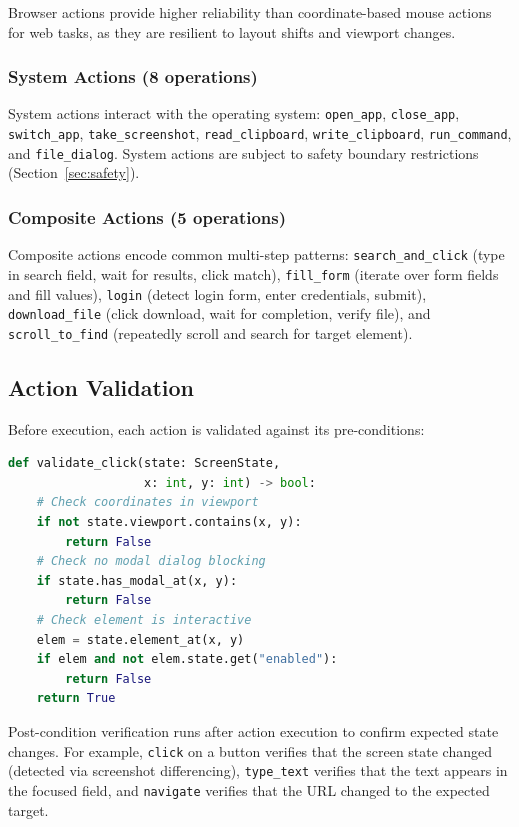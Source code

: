 \documentclass[11pt,twocolumn]{article}
\begin{document}
Browser actions provide higher reliability than coordinate-based mouse actions for web tasks, as they are resilient to layout shifts and viewport changes.

\subsubsection{System Actions (8 operations)}

System actions interact with the operating system: \texttt{open\_app}, \texttt{close\_app}, \texttt{switch\_app}, \texttt{take\_screenshot}, \texttt{read\_clipboard}, \texttt{write\_clipboard}, \texttt{run\_command}, and \texttt{file\_dialog}. System actions are subject to safety boundary restrictions (Section~\ref{sec:safety}).

\subsubsection{Composite Actions (5 operations)}

Composite actions encode common multi-step patterns: \texttt{search\_and\_click} (type in search field, wait for results, click match), \texttt{fill\_form} (iterate over form fields and fill values), \texttt{login} (detect login form, enter credentials, submit), \texttt{download\_file} (click download, wait for completion, verify file), and \texttt{scroll\_to\_find} (repeatedly scroll and search for target element).

\subsection{Action Validation}

Before execution, each action is validated against its pre-conditions:

\begin{lstlisting}[language=Python, caption=Pre-condition validation]
def validate_click(state: ScreenState,
                   x: int, y: int) -> bool:
    # Check coordinates in viewport
    if not state.viewport.contains(x, y):
        return False
    # Check no modal dialog blocking
    if state.has_modal_at(x, y):
        return False
    # Check element is interactive
    elem = state.element_at(x, y)
    if elem and not elem.state.get("enabled"):
        return False
    return True
\end{lstlisting}

Post-condition verification runs after action execution to confirm expected state changes. For example, \texttt{click} on a button verifies that the screen state changed (detected via screenshot differencing), \texttt{type\_text} verifies that the text appears in the focused field, and \texttt{navigate} verifies that the URL changed to the expected target.
\end{document}
